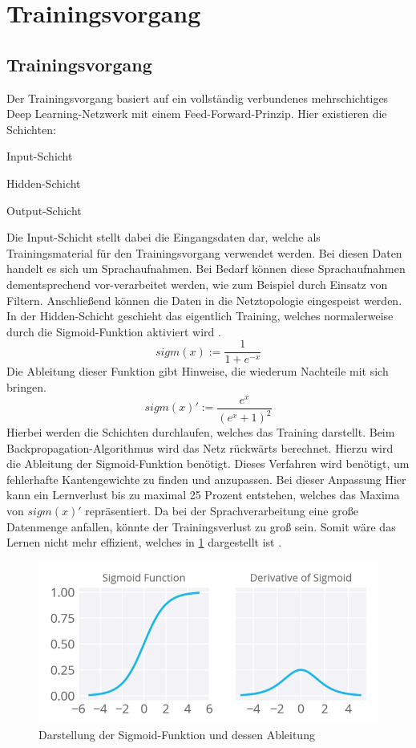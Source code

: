 \section{Trainingsvorgang}

\subsection{Trainingsvorgang}
Der Trainingsvorgang basiert auf ein vollständig verbundenes mehrschichtiges Deep Learning-Netzwerk mit einem Feed-Forward-Prinzip. Hier existieren die Schichten:
\begin{description}
	\item Input-Schicht
	\item Hidden-Schicht 
	\item Output-Schicht
\end{description}
Die Input-Schicht stellt dabei die Eingangsdaten dar, welche als Trainingsmaterial für den Trainingsvorgang verwendet werden. Bei diesen Daten handelt es sich um Sprachaufnahmen. Bei Bedarf können diese Sprachaufnahmen dementsprechend vor-verarbeitet werden, wie zum Beispiel durch Einsatz von Filtern. Anschließend können die Daten in die Netztopologie eingespeist werden. In der Hidden-Schicht geschieht das eigentlich Training, welches normalerweise durch die Sigmoid-Funktion aktiviert wird \cite{bishop.2006}.
\begin{equation*}
sigm(x) :=\frac{ 1 }{1+e^{-x}  }
\label{normal}
\end{equation*}
Die Ableitung dieser Funktion gibt Hinweise, die wiederum Nachteile mit sich bringen.
\begin{equation*}
sigm(x)':= \frac{ e^{x} }{(e^{x} +1)^2  }
\label{ableitung}
\end{equation*}
Hierbei werden die Schichten durchlaufen, welches das Training darstellt. 
Beim Backpropagation-Algorithmus wird das Netz rückwärts berechnet. Hierzu wird die Ableitung der Sigmoid-Funktion benötigt. Dieses Verfahren wird benötigt, um fehlerhafte Kantengewichte zu finden und anzupassen. Bei dieser Anpassung  Hier kann ein Lernverlust bis zu maximal 25 Prozent entstehen, welches das Maxima von $sigm(x)'$ repräsentiert. Da bei der Sprachverarbeitung eine große Datenmenge anfallen, könnte der Trainingsverlust zu groß sein.  Somit wäre das Lernen nicht mehr effizient, welches in \ref{fig:features11.0} dargestellt ist \cite{Kulbear.2017}.
\begin{figure}[h!]
	\centering
	\includegraphics[width=1.0\linewidth]{images/sigmund}
	\caption{Darstellung der Sigmoid-Funktion und dessen Ableitung \cite{Kulbear.2017}} %
	\label{fig:features11.0}
\end{figure}
